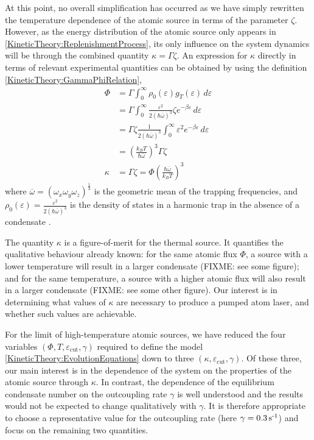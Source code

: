 At this point, no overall simplification has occurred as we have simply rewritten the temperature dependence of the atomic source in terms of the parameter $\zeta$. However, as the energy distribution of the atomic source only appears in \eqref{KineticTheory:ReplenishmentProcess}, its only influence on the system dynamics will be through the combined quantity $\kappa = \Gamma \zeta$. An expression for $\kappa$ directly in terms of relevant experimental quantities can be obtained by using the definition \eqref{KineticTheory:GammaPhiRelation},
\begin{align}
    \Phi &= \Gamma \int_0^\infty \rho_0(\varepsilon) g_T(\varepsilon)\, d\varepsilon\\
    &= \Gamma \int_0^\infty \frac{\varepsilon^2}{2 (\hbar \overline{\omega})^3} \zeta e^{-\beta \varepsilon}\, d\varepsilon\\
    &= \Gamma \zeta \frac{1}{2 (\hbar \overline{\omega})^3} \int_0^\infty \varepsilon^2 e^{-\beta \varepsilon}\, d\varepsilon\\
    &= \left(\frac{k_B T}{\hbar \overline{\omega}}\right)^3 \Gamma \zeta\\
    \kappa &= \Gamma \zeta = \Phi \left(\frac{\hbar \overline{\omega}}{k_B T}\right)^3
\end{align}
where $\overline{\omega} = \left(\omega_x \omega_y \omega_z\right)^{\frac{1}{3}}$ is the geometric mean of the trapping frequencies, and $\displaystyle\rho_0(\varepsilon) = \frac{\varepsilon^2}{2 (\hbar \overline{\omega})^3}$ is the density of states in a harmonic trap in the absence of a condensate \citep{PethickSmith}.

The quantity $\kappa$ is a figure-of-merit for the thermal source. It quantifies the qualitative behaviour already known: for the same atomic flux $\Phi$, a source with a lower temperature will result in a larger condensate (FIXME: see some figure); and for the same temperature, a source with a higher atomic flux will also result in a larger condensate (FIXME: see some other figure). Our interest is in determining what values of $\kappa$ are necessary to produce a pumped atom laser, and whether such values are achievable.

For the limit of high-temperature atomic sources, we have reduced the four variables $(\Phi, T, \varepsilon_\text{cut}, \gamma)$ required to define the model \eqref{KineticTheory:EvolutionEquations} down to three $(\kappa, \varepsilon_\text{cut}, \gamma)$. Of these three, our main interest is in the dependence of the system on the properties of the atomic source through $\kappa$. In contrast, the dependence of the equilibrium condensate number on the outcoupling rate $\gamma$ is well understood and the results would not be expected to change qualitatively with $\gamma$. It is therefore appropriate to choose a representative value for the outcoupling rate (here $\gamma = \unit[0.3]{s\textsuperscript{-1}}$) and focus on the remaining two quantities.

